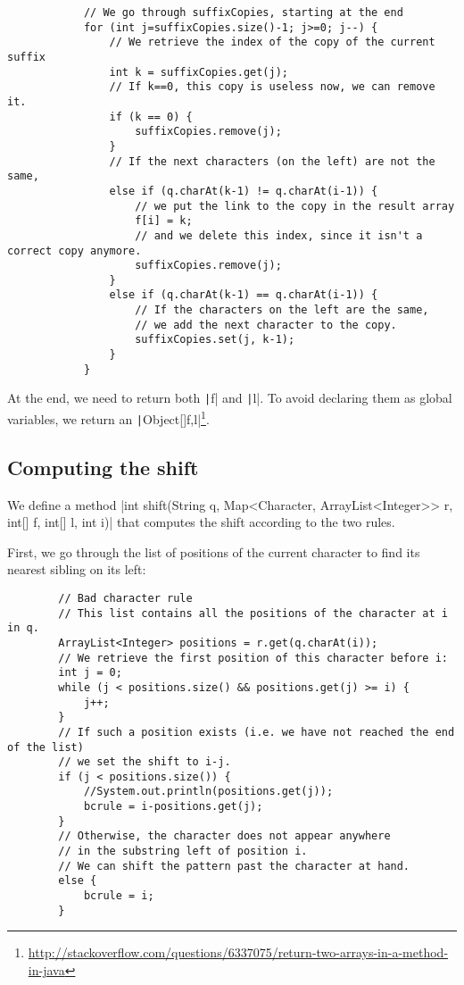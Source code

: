 \documentclass[a4paper,11pt,openany,extrafontsizes,twoside,article]{memoir}
\begin{document}
\begin{verbatim}
            // We go through suffixCopies, starting at the end
            for (int j=suffixCopies.size()-1; j>=0; j--) {
                // We retrieve the index of the copy of the current suffix
                int k = suffixCopies.get(j);
                // If k==0, this copy is useless now, we can remove it.
                if (k == 0) {
                    suffixCopies.remove(j);
                }
                // If the next characters (on the left) are not the same,
                else if (q.charAt(k-1) != q.charAt(i-1)) {
                    // we put the link to the copy in the result array
                    f[i] = k;
                    // and we delete this index, since it isn't a correct copy anymore.
                    suffixCopies.remove(j);
                }
                else if (q.charAt(k-1) == q.charAt(i-1)) {
                    // If the characters on the left are the same,
                    // we add the next character to the copy.
                    suffixCopies.set(j, k-1);
                }
            }
\end{verbatim}

At the end, we need to return both \texttt|f| and
\texttt|l|. To avoid declaring them as global variables, we
return an
\texttt|Object[]{f,l}|\footnote{\url{http://stackoverflow.com/questions/6337075/return-two-arrays-in-a-method-in-java}}.

\subsection{Computing the shift}
\label{sec:computing-shift}

We define a method |int shift(String q, Map<Character,
ArrayList<Integer>> r, int[] f, int[] l, int i)| that computes the
shift according to the two rules.

First, we go through the list of positions of the current character to
find its nearest sibling on its left:

\begin{verbatim}
        // Bad character rule
        // This list contains all the positions of the character at i in q.
        ArrayList<Integer> positions = r.get(q.charAt(i));
        // We retrieve the first position of this character before i:
        int j = 0;
        while (j < positions.size() && positions.get(j) >= i) {
            j++;
        }
        // If such a position exists (i.e. we have not reached the end of the list)
        // we set the shift to i-j.
        if (j < positions.size()) {
            //System.out.println(positions.get(j));
            bcrule = i-positions.get(j);
        }
        // Otherwise, the character does not appear anywhere
        // in the substring left of position i.
        // We can shift the pattern past the character at hand.
        else {
            bcrule = i;
        }
\end{verbatim}
\end{document}
